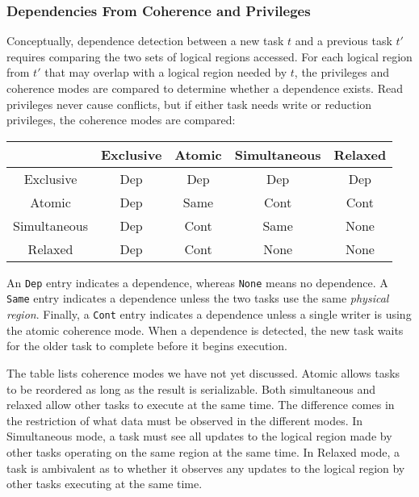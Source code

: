 \subsubsection{Dependencies From Coherence and Privileges}
\label{subsec:cohdep}
Conceptually, dependence detection between a new task $t$ and a previous task $t'$ requires comparing the two sets of
logical regions accessed.  For each logical region from $t'$
that may overlap with a logical region needed by $t$, the privileges
and coherence modes are compared to determine whether a dependence exists.  Read
privileges never cause conflicts, but if either 
task needs write or reduction privileges, the coherence modes are compared:

\vspace{2mm}
{\small
\begin{tabular}{c|cccc}
             & Exclusive & Atomic   & Simultaneous & Relaxed \\
\midrule
Exclusive    & Dep & Dep & Dep & Dep \\ 
Atomic       & Dep & Same & Cont & Cont \\
Simultaneous & Dep & Cont & Same & None \\
Relaxed      & Dep & Cont & None & None \\
\end{tabular}
}
\vspace{2mm}

An {\tt Dep} entry indicates a dependence, whereas {\tt None}
means no dependence.  A
{\tt Same} entry indicates a dependence unless the two tasks 
use the same {\em physical region}.  Finally, a {\tt Cont} entry
indicates a dependence unless a single writer is using the
atomic coherence mode.  When a dependence is detected, the new task 
waits for the older task to complete before it begins execution.

The table lists coherence modes we have not yet discussed.  Atomic
allows tasks to be reordered as long as the result is
serializable.  Both simultaneous and relaxed allow other tasks to
execute at the same time.  The difference comes in the restriction of
what data must be observed in the different modes.  In Simultaneous
mode, a task must see all updates to the logical region made by other
tasks operating on the same region at the same time.  In Relaxed mode,
a task is ambivalent as to whether it observes any updates to the
logical region by other tasks executing at the same time.


